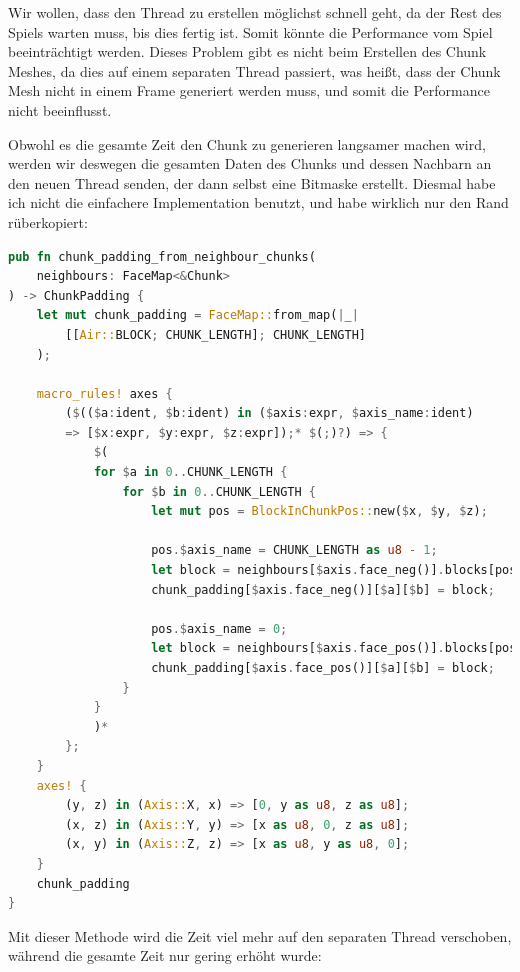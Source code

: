 Wir wollen, dass den Thread zu erstellen möglichst
schnell geht, da der Rest des Spiels warten muss,
bis dies fertig ist. Somit könnte die Performance
vom Spiel beeinträchtigt werden. Dieses Problem gibt
es nicht beim Erstellen des Chunk Meshes, da dies auf
einem separaten Thread passiert, was heißt, dass der
Chunk Mesh nicht in einem Frame generiert werden muss,
und somit die Performance nicht beeinflusst.

Obwohl es die gesamte Zeit den Chunk zu generieren
langsamer machen wird, werden wir deswegen die gesamten
Daten des Chunks und dessen Nachbarn an den neuen
Thread senden, der dann selbst eine Bitmaske erstellt.
Diesmal habe ich nicht die einfachere Implementation
benutzt, und habe wirklich nur den Rand rüberkopiert:

\begin{lstlisting}[language=Rust]
pub fn chunk_padding_from_neighbour_chunks(
	neighbours: FaceMap<&Chunk>
) -> ChunkPadding {
	let mut chunk_padding = FaceMap::from_map(|_|
		[[Air::BLOCK; CHUNK_LENGTH]; CHUNK_LENGTH]
	);

	macro_rules! axes {
		($(($a:ident, $b:ident) in ($axis:expr, $axis_name:ident)
		=> [$x:expr, $y:expr, $z:expr]);* $(;)?) => {
			$(
			for $a in 0..CHUNK_LENGTH {
				for $b in 0..CHUNK_LENGTH {
					let mut pos = BlockInChunkPos::new($x, $y, $z);

					pos.$axis_name = CHUNK_LENGTH as u8 - 1;
					let block = neighbours[$axis.face_neg()].blocks[pos];
					chunk_padding[$axis.face_neg()][$a][$b] = block;

					pos.$axis_name = 0;
					let block = neighbours[$axis.face_pos()].blocks[pos];
					chunk_padding[$axis.face_pos()][$a][$b] = block;
				}
			}
			)*
		};
	}
	axes! {
		(y, z) in (Axis::X, x) => [0, y as u8, z as u8];
		(x, z) in (Axis::Y, y) => [x as u8, 0, z as u8];
		(x, y) in (Axis::Z, z) => [x as u8, y as u8, 0];
	}
	chunk_padding
}
\end{lstlisting}

Mit dieser Methode wird die Zeit viel mehr auf den
separaten Thread verschoben, während die gesamte
Zeit nur gering erhöht wurde:

\vspace{0.3cm}



